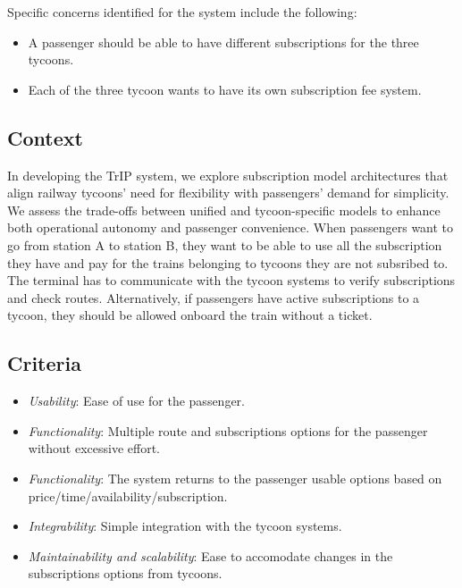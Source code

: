 Specific concerns identified for the system include the following:
\begin{itemize}
    \item A passenger should be able to have different subscriptions for the three tycoons.
    \item Each of the three tycoon wants to have its own subscription fee system.
\end{itemize}

\subsection*{Context}
In developing the TrIP system, we explore subscription model architectures that align railway tycoons' need for flexibility with passengers' demand for simplicity. 
We assess the trade-offs between unified and tycoon-specific models to enhance both operational autonomy and passenger convenience.
When passengers want to go from station A to station B, they want to be able to use all the subscription they have and pay for the trains belonging to tycoons they are not subsribed to.
The terminal has to communicate with the tycoon systems to verify subscriptions and check routes.
Alternatively, if passengers have active subscriptions to a tycoon, they should be allowed onboard the train without a ticket. 

\subsection*{Criteria}
\begin{itemize}
    \item \textit{Usability}: Ease of use for the passenger.
    \item \textit{Functionality}: Multiple route and subscriptions options for the passenger without excessive effort.
    \item \textit{Functionality}: The system returns to the passenger usable options based on price/time/availability/subscription.
    \item \textit{Integrability}: Simple integration with the tycoon systems.
    \item \textit{Maintainability and scalability}: Ease to accomodate changes in the subscriptions options from tycoons.
\end{itemize}

